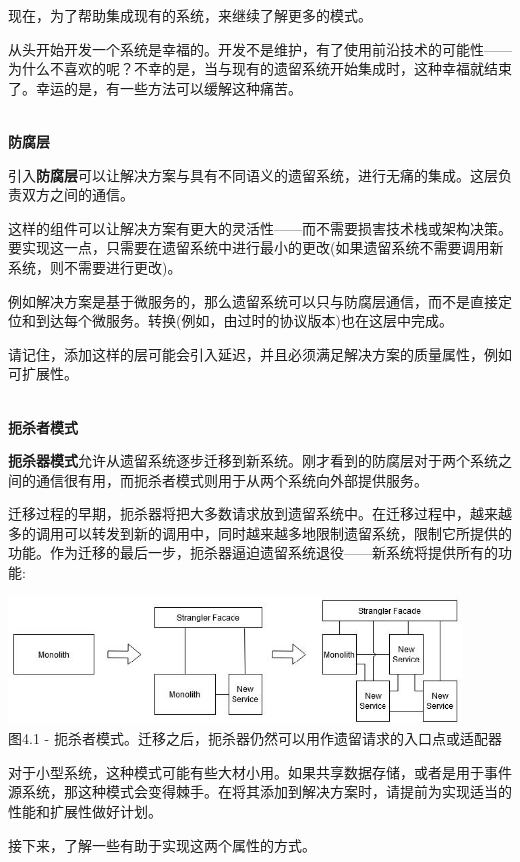 现在，为了帮助集成现有的系统，来继续了解更多的模式。


从头开始开发一个系统是幸福的。开发不是维护，有了使用前沿技术的可能性——为什么不喜欢的呢？不幸的是，当与现有的遗留系统开始集成时，这种幸福就结束了。幸运的是，有一些方法可以缓解这种痛苦。

\hspace*{\fill} \\ %
\noindent
\textbf{防腐层}

引入\textbf{防腐层}可以让解决方案与具有不同语义的遗留系统，进行无痛的集成。这层负责双方之间的通信。

这样的组件可以让解决方案有更大的灵活性——而不需要损害技术栈或架构决策。要实现这一点，只需要在遗留系统中进行最小的更改(如果遗留系统不需要调用新系统，则不需要进行更改)。

例如解决方案是基于微服务的，那么遗留系统可以只与防腐层通信，而不是直接定位和到达每个微服务。转换(例如，由过时的协议版本)也在这层中完成。

请记住，添加这样的层可能会引入延迟，并且必须满足解决方案的质量属性，例如可扩展性。

\hspace*{\fill} \\ %
\noindent
\textbf{扼杀者模式}

\textbf{扼杀器模式}允许从遗留系统逐步迁移到新系统。刚才看到的防腐层对于两个系统之间的通信很有用，而扼杀者模式则用于从两个系统向外部提供服务。

迁移过程的早期，扼杀器将把大多数请求放到遗留系统中。在迁移过程中，越来越多的调用可以转发到新的调用中，同时越来越多地限制遗留系统，限制它所提供的功能。作为迁移的最后一步，扼杀器逼迫遗留系统退役——新系统将提供所有的功能:

\begin{center}
\includegraphics[width=0.9\textwidth]{content/2/chapter4/images/1.jpg}\\
图4.1 - 扼杀者模式。迁移之后，扼杀器仍然可以用作遗留请求的入口点或适配器
\end{center}

对于小型系统，这种模式可能有些大材小用。如果共享数据存储，或者是用于事件源系统，那这种模式会变得棘手。在将其添加到解决方案时，请提前为实现适当的性能和扩展性做好计划。

接下来，了解一些有助于实现这两个属性的方式。















